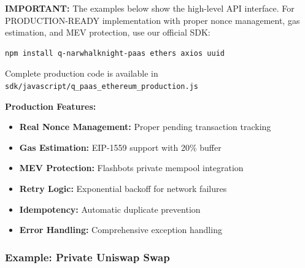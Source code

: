 \documentclass[11pt,a4paper]{article}
\begin{document}
\textbf{IMPORTANT:} The examples below show the high-level API interface. For PRODUCTION-READY implementation with proper nonce management, gas estimation, and MEV protection, use our official SDK:

\begin{lstlisting}[language=bash]
npm install q-narwhalknight-paas ethers axios uuid
\end{lstlisting}

Complete production code is available in \texttt{sdk/javascript/q\_paas\_ethereum\_production.js}

\textbf{Production Features:}
\begin{itemize}
    \item \textbf{Real Nonce Management:} Proper pending transaction tracking
    \item \textbf{Gas Estimation:} EIP-1559 support with 20\% buffer
    \item \textbf{MEV Protection:} Flashbots private mempool integration
    \item \textbf{Retry Logic:} Exponential backoff for network failures
    \item \textbf{Idempotency:} Automatic duplicate prevention
    \item \textbf{Error Handling:} Comprehensive exception handling
\end{itemize}

\subsubsection{Example: Private Uniswap Swap}
\end{document}
